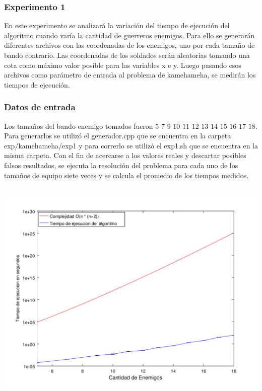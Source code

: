     	\subsubsection*{Experimento 1}\;

    		En este experimento se analizará la variación del tiempo de ejecución del algoritmo cuando varía la cantidad de guerreros enemigos. Para ello se generarán diferentes archivos con las coordenadas de los enemigos, uno por cada tamaño de bando contrario. Las coordenadas de los soldados serán aleatorias tomando una cota como máximo valor posible para las variables x e y. Luego pasando esos archivos como parámetro de entrada al problema de kamehameha, se medirán los tiempos de ejecución. \;

    	\subsubsection*{Datos de entrada}\;
    		Los tamaños del bando enemigo tomados fueron $5$ $7$ $9$ $10$ $11$ $12$ $13$ $14$ $15$ $16$ $17$ $18$.
			Para generarlos se utilizó el generador.cpp que se encuentra en la carpeta exp/kamehameha/exp1 y para correrlo se utilizó el exp1.sh que se encuentra en la misma carpeta. \;
			Con el fin de acercarse a los valores reales y descartar posibles falsos resultados, se ejecuta la resolución del problema para cada uno de los tamaños de equipo siete veces y se calcula el promedio de los tiempos medidos.\;

      \includegraphics[height=11cm]{graficos/kamehameha-exp1.png}



